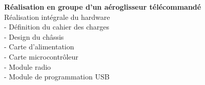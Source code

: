 \documentclass[a4paper]{article}
\begin{document}
{\begin{minipage}[t]{0.6\paperwidth}
{\begin{minipage}[H]{0.58\paperwidth}
		\hspace{1cm} \textbf{Réalisation en groupe d'un aéroglisseur télécommandé}\\
		\hspace{1cm} Réalisation intégrale du hardware\\
		\hspace{2cm} - Définition du cahier des charges\\
		\hspace{2cm} - Design du châssis\\
		\hspace{2cm} - Carte d'alimentation\\
		\hspace{2cm} - Carte microcontrôleur\\
		\hspace{2cm} - Module radio\\
		\hspace{2cm} - Module de programmation USB\\
		\end{minipage}\if{}} \fi
	\end{minipage}\if{}} \fi
\end{document}
